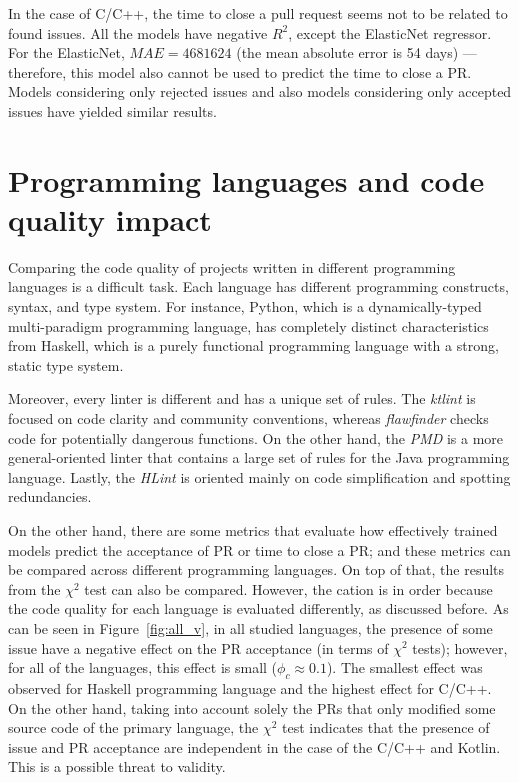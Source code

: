 \documentclass[digital,oneside,oldtable,nolof,nolot,nocover]{fithesis4}
\begin{document}
In the case of C/C++, the time to close a pull request seems not to be related
to found issues.  All the models have negative \(R^2\), except the ElasticNet
regressor. For the ElasticNet, \(MAE = 4681624\) (the mean absolute error is 54
days) --- therefore, this model also cannot be used to predict the time to
close a PR.  Models considering only rejected issues and also models
considering only accepted issues have yielded similar results.
\section{Programming languages and code quality impact}
\label{sec:org86fcfe3}
Comparing the code quality of projects written in different programming
languages is a difficult task.  Each language has different programming
constructs, syntax, and type system. For instance, Python, which is
a dynamically-typed multi-paradigm programming language, has completely
distinct characteristics from Haskell, which is a purely functional programming
language with a strong, static type system.

Moreover, every linter is different and has a unique set of rules.  The
\emph{ktlint} is focused on code clarity and community conventions, whereas
\emph{flawfinder} checks code for potentially dangerous functions. On the other
hand, the \emph{PMD} is a more general-oriented linter that contains a large set of
rules for the Java programming language. Lastly, the \emph{HLint} is oriented mainly
on code simplification and spotting redundancies.

On the other hand, there are some metrics that evaluate how effectively
trained models predict the acceptance of PR or time to close a PR;
and these metrics can be compared across different programming languages.
On top of that, the results from the \(\chi^2\) test can also be compared.
However, the cation is in order because the code quality for each language is
evaluated differently, as discussed before.
As can be seen in Figure~\ref{fig:all_v}, in all studied languages, the
presence of some issue have a negative effect on the PR acceptance (in terms
of \(\chi^2\) tests); however, for all of the languages, this effect is small (\(\phi_c
   \approx 0.1\)).  The smallest effect was observed for Haskell programming
language and the highest effect for C/C++.  On the other hand,
taking into account solely the PRs that only modified some source code of the
primary language, the \(\chi^2\) test indicates that the presence of issue and PR
acceptance are independent in the case of the C/C++ and Kotlin. This is a possible
threat to validity.
\end{document}
